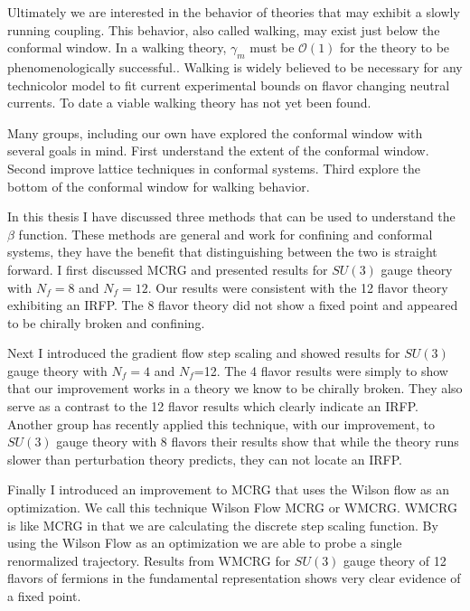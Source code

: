 Ultimately we are interested in the behavior of theories that may exhibit a slowly running coupling.
This behavior, also called walking, may exist just below the conformal window.
In a walking theory, $\gamma_m$ must be $\mathcal{O}(1)$ for the theory to be phenomenologically successful..
Walking is widely believed to be necessary for any technicolor model to fit current experimental bounds on flavor changing neutral currents.
To date a viable walking theory has not yet been found.

Many groups, including our own have explored the conformal window with several goals in mind.
First understand the extent of the conformal window.
Second improve lattice techniques in conformal systems.
Third explore the bottom of the conformal window for walking behavior.

In this thesis I have discussed three methods that can be used to understand the $\beta$ function.
These methods are general and work for confining and conformal systems, they have the benefit that distinguishing between the two is straight forward.
I first discussed MCRG and presented results for $SU(3)$ gauge theory with $N_f=8$ and $N_f=12$.
Our results were consistent with the 12 flavor theory exhibiting an IRFP.
The 8 flavor theory did not show a fixed point and appeared to be chirally broken and confining.

Next I introduced the gradient flow step scaling and showed results for $SU(3)$ gauge theory with $N_f=4$ and $N_f$=12.
The 4 flavor results were simply to show that our improvement works in a theory we know to be chirally broken.
They also serve as a contrast to the 12 flavor results which clearly indicate an IRFP.
Another group has recently applied this technique, with our improvement, to $SU(3)$ gauge theory with 8 flavors \cite{Hasenfratz:2014rna} their results show that while the theory runs slower than perturbation theory predicts, they can not locate an IRFP.

Finally I introduced an improvement to MCRG that uses the Wilson flow as an optimization.
We call this technique Wilson Flow MCRG or WMCRG.
WMCRG is like MCRG in that we are calculating the discrete step scaling function.
By using the Wilson Flow as an optimization we are able to probe a single renormalized trajectory.
Results from WMCRG for $SU(3)$ gauge theory of 12 flavors of fermions in the fundamental representation shows very clear evidence of a fixed point.

